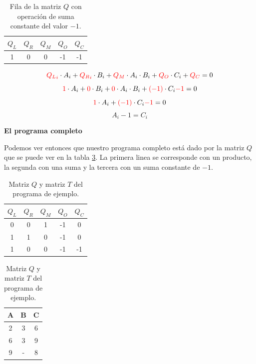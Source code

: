 \begin{table}
\begin{center}
\begin{tabular}{ccccc}
\toprule
\textbf{$Q_L$} & \textbf{$Q_R$} & \textbf{$Q_M$} & \textbf{$Q_O$} & \textbf{$Q_C$} \\
\midrule
1 & 0 & 0 & -1 & -1 \\
\bottomrule
\end{tabular}
\caption{Fila de la matriz $Q$ con operación de suma constante del valor $-1$.}
\label{tab:q_suma_constante}
\end{center}
\end{table}

\begin{samepage}
$$\textcolor{red}{{Q_L}_i} \cdot A_i + \textcolor{red}{{Q_R}_i} \cdot B_i + \textcolor{red}{Q_M}\cdot A_i\cdot B_i + \textcolor{red}{Q_O}\cdot C_i + \textcolor{red}{Q_C} = 0$$
$$\textcolor{red}{1} \cdot A_i + \textcolor{red}{0} \cdot B_i + \textcolor{red}{0}\cdot A_i\cdot B_i + \textcolor{red}{(-1)} \cdot C_i \textcolor{red}{-1} = 0$$
$$\textcolor{red}{1} \cdot A_i + \textcolor{red}{(-1)} \cdot C_i \textcolor{red}{-1} = 0$$
$$A_i - 1 = C_i$$
\end{samepage}


\textbf{El programa completo}

Podemos ver entonces que nuestro programa completo está dado por la matriz $Q$ que se puede ver en la tabla \ref{tab:matrices_completas}. La primera linea se corresponde con un producto, la segunda con una suma y la tercera con un suma constante de $-1$.

\begin{table}[h!]
\centering
\begin{minipage}{0.45\textwidth}
\centering
\begin{tabular}{ccccc}
\toprule
\textbf{$Q_L$} & \textbf{$Q_R$} & \textbf{$Q_M$} & \textbf{$Q_O$} & \textbf{$Q_C$} \\
\midrule
0 & 0 & 1 & -1 & 0 \\
1 & 1 & 0 & -1 & 0 \\
1 & 0 & 0 & -1 & -1 \\
\bottomrule
\end{tabular}
\end{minipage}
\begin{minipage}{0.45\textwidth}
\centering
\begin{tabular}{ccc}
\toprule
A & B & C \\
\midrule
2 & 3 & 6 \\
6 & 3 & 9 \\
9 & - & 8 \\
\bottomrule
\end{tabular}
\end{minipage}

\caption{Matriz $Q$ y matriz $T$ del programa de ejemplo.}
\label{tab:matrices_completas}
\end{table}

